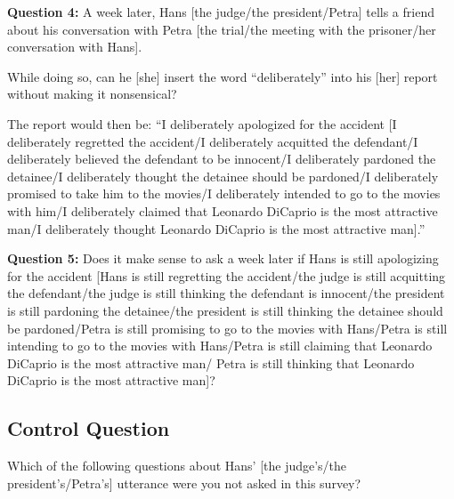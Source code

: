\documentclass[egregdoesnotlikesansseriftitles,12pt]{scrartcl}
\begin{document}
\vspace{1ex}
\noindent\textbf{Question 4:} A week later, Hans [the judge/the president/Petra] tells a friend about his conversation with Petra [the trial/the meeting with the prisoner/her conversation with Hans].

While doing so, can he [she] insert the word ``deliberately'' into his [her] report without making it nonsensical?

The report would then be: ``I deliberately apologized for the accident [I deliberately regretted the accident/I deliberately acquitted the defendant/I deliberately believed the defendant to be innocent/I deliberately pardoned the detainee/I deliberately thought the detainee should be pardoned/I deliberately promised to take him to the movies/I deliberately intended to go to the movies with him/I deliberately claimed that Leonardo DiCaprio is the most attractive man/I deliberately thought Leonardo DiCaprio is the most attractive man].''

\vspace{1ex}
\noindent\textbf{Question 5:} Does it make sense to ask a week later if Hans is still apologizing for the accident [Hans is still regretting the accident/the judge is still acquitting the defendant/the judge is still thinking the defendant is innocent/the president is still pardoning the detainee/the president is still thinking the detainee should be pardoned/Petra is still promising to go to the movies with Hans/Petra is still intending to go to the movies with Hans/Petra is still claiming that Leonardo DiCaprio is the most attractive man/ Petra is still thinking that Leonardo DiCaprio is the most attractive man]?


\subsection{Control Question}\label{sec:app_control}
Which of the following questions about Hans' [the judge's/the president's/Petra's] utterance were you not asked in this survey?
\end{document}
